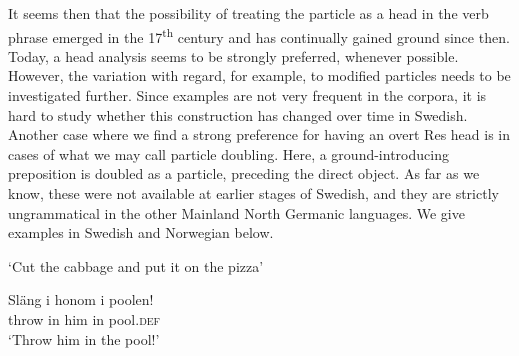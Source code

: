 \documentclass[output=paper]{langscibook}
\begin{document}
\ea\label{ex:lalu:68}
\z
\ex\label{ex:lalu:69}
\z
\z


It seems then that the possibility of treating the particle as a head in the verb phrase emerged in the 17\textsuperscript{th} century and has continually gained ground since then. Today, a head analysis seems to be strongly preferred, whenever possible. However, the variation with regard, for example, to modified particles needs to be investigated further. Since examples are not very frequent in the corpora, it is hard to study whether this construction has changed over time in Swedish. Another case where we find a strong preference for having an overt Res head is in cases of what we may call particle doubling. Here, a ground-introducing preposition is doubled as a particle, preceding the direct object. As far as we know, these were not available at earlier stages of Swedish, and they are strictly ungrammatical in the other Mainland North Germanic languages. We give examples in Swedish  and Norwegian  below.


\ea\label{ex:lalu:70}
\glt `Cut the cabbage and put it on the pizza'

\ex
\gll  Släng   i   honom   i     poolen! \\
    throw   in   him     in     pool\textsc{.def} \\
\glt `Throw him in the pool!'
\z
\ex\label{ex:lalu:71}
\end{document}
